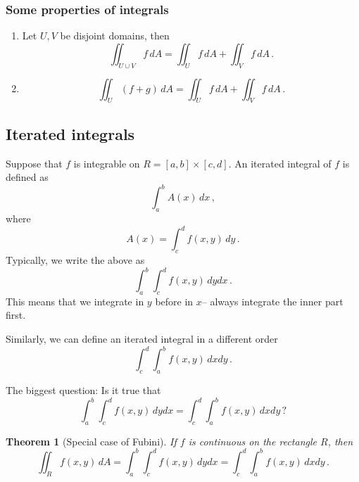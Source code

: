\documentclass[
]{article}
\newtheorem{theorem}{Theorem}[section]
\theoremstyle{definition}
\theoremstyle{definition}
\theoremstyle{definition}
\theoremstyle{definition}
\theoremstyle{remark}
\begin{document}
\hypertarget{some-properties-of-integrals}{%
\subsubsection{Some properties of integrals}\label{some-properties-of-integrals}}

\begin{enumerate}
\def\labelenumi{\arabic{enumi}.}
\item
  Let \(U, V\) be disjoint domains, then
  \begin{equation*}
  \iint_{U \cup V} f \, dA = \iint_U f \, dA + \iint_V f\, dA \,. 
  \end{equation*}
\item
  \begin{equation*}
   \iint_U (f + g) \, dA = \iint_U f \, dA + \iint_V f \, dA \,.
  \end{equation*}
\end{enumerate}

\hypertarget{iterated-integrals}{%
\subsection{Iterated integrals}\label{iterated-integrals}}

Suppose that \(f\) is integrable on \(R= [a,b]\times [c,d]\).
An iterated integral of \(f\) is defined as
\begin{equation*}
    \int_a^b A(x) \, dx \,,
\end{equation*}
where
\begin{equation*}
    A(x) = \int_c^d f(x,y) \, dy \,.
\end{equation*}
Typically, we write the above as
\begin{equation*}
   \int_a^b \int_c^d f(x,y) \, dy dx \,. 
\end{equation*}
This means that we integrate in \(y\) before in \(x\)-- always integrate the inner part first.

Similarly, we can define an iterated integral in a different order
\begin{equation*}
    \int_c^d \int_a^b f(x,y) \, dx dy \,.
\end{equation*}

The biggest question:
Is it true that
\begin{equation*}
   \int_a^b \int_c^d f(x,y) \, dy dx  =
    \int_c^d \int_a^b f(x,y) \, dx dy \,?
\end{equation*}

\begin{theorem}[Special case of Fubini]
If \(f\) is continuous on the rectangle \(R\), then
\begin{equation*}
    \iint_R f(x,y) \, dA = \int_a^b \int_c^d f(x,y) \, dy dx = \int_c^d \int_a^b f(x,y) \, dx dy \,.
\end{equation*}
\end{theorem}
\end{document}
